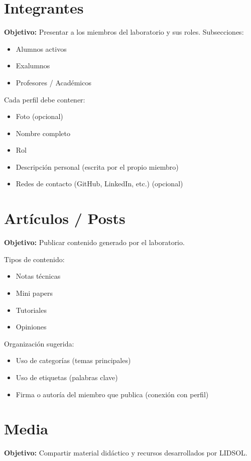 \documentclass[12pt]{article}
\begin{document}
\section{Integrantes}
\textbf{Objetivo:} Presentar a los miembros del laboratorio y sus roles.  
Subsecciones:
\begin{itemize}
    \item Alumnos activos
    \item Exalumnos
    \item Profesores / Académicos
\end{itemize}

Cada perfil debe contener:
\begin{itemize}[label=--]
    \item Foto (opcional)
    \item Nombre completo
    \item Rol
    \item Descripción personal (escrita por el propio miembro)
    \item Redes de contacto (GitHub, LinkedIn, etc.) (opcional)
\end{itemize}

\section{Artículos / Posts}
\textbf{Objetivo:} Publicar contenido generado por el laboratorio.

Tipos de contenido:
\begin{itemize}[label=--]
    \item Notas técnicas
    \item Mini papers
    \item Tutoriales
    \item Opiniones
\end{itemize}

Organización sugerida:
\begin{itemize}[label=--]
    \item Uso de categorías (temas principales)
    \item Uso de etiquetas (palabras clave)
    \item Firma o autoría del miembro que publica (conexión con perfil)
\end{itemize}

\section{Media}
\textbf{Objetivo:} Compartir material didáctico y recursos desarrollados por LIDSOL.
\end{document}
